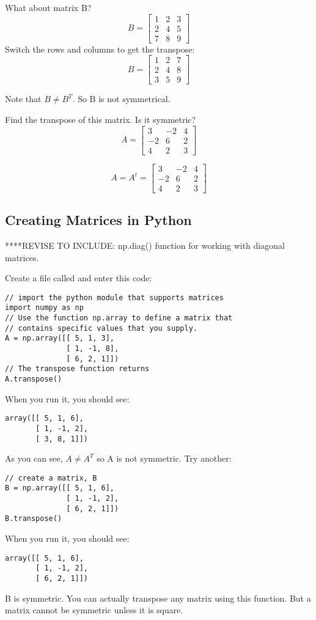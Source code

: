 What about matrix B? 
$$
B = \begin{bmatrix}
1 & 2 & 3 \\
2 & 4 & 5 \\
7 & 8 & 9
\end{bmatrix}
$$
Switch the rows and columns to get the transpose:
$$
B = \begin{bmatrix}
1 & 2 & 7 \\
2 & 4 & 8 \\
3 & 5 & 9
\end{bmatrix}
$$

Note that $B \neq B^T$. So B is not symmetrical.

\begin{Exercise}[title={Matrix Transposition}, label=matrix-transpose01]
Find the transpose of this matrix. Is it symmetric? 
$$A = \begin{bmatrix}
 		3 & -2 &4  \\
 		-2 & 6 &2 \\
 		4 & 2 & 3 
	  \end{bmatrix}$$
\end{Exercise}
\begin{Answer}[ref=matrix-transpose01]
$$A =  A^t = 
	  \begin{bmatrix}
 		3 & -2 & 4  \\
 		-2 & 6 & 2 \\
 		4 & 2 & 3 
	\end{bmatrix}$$
\end{Answer}

\subsection{Creating Matrices in Python}

****REVISE TO INCLUDE: np.diag() function for working with diagonal matrices.

Create a file called  and enter this code:
\begin{Verbatim}
// import the python module that supports matrices
import numpy as np
// Use the function np.array to define a matrix that 
// contains specific values that you supply.
A = np.array([[ 5, 1, 3], 
              [ 1, -1, 8], 
              [ 6, 2, 1]])
// The transpose function returns 
A.transpose()
\end{Verbatim}
When you run it, you should see:
\begin{Verbatim}
array([[ 5, 1, 6], 
       [ 1, -1, 2], 
       [ 3, 8, 1]])
\end{Verbatim}
As you can see, $A\neq A^T$ so A is not symmetric.
Try another: 
\begin{Verbatim}
// create a matrix, B
B = np.array([[ 5, 1, 6], 
              [ 1, -1, 2], 
              [ 6, 2, 1]])
B.transpose()
\end{Verbatim}
When you run it, you should see:
\begin{Verbatim}
array([[ 5, 1, 6], 
       [ 1, -1, 2], 
       [ 6, 2, 1]])
\end{Verbatim}
B is symmetric. You can actually transpose any matrix using this function. But a matrix cannot be symmetric unless it is square. 

